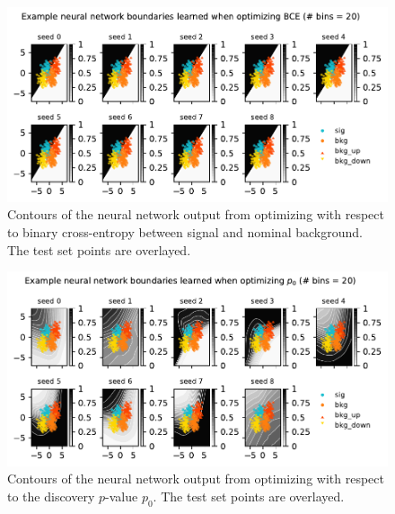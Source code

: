\documentclass[
  11pt,
  numbers=noendperiod]{book}
\begin{document}
\begin{figure}

{\centering \includegraphics{./images/new-grid-models-bce-20nobin (1).pdf}

}

\caption{\label{fig-grid-20bin-bce}Contours of the neural network output
from optimizing with respect to binary cross-entropy between signal and
nominal background. The test set points are overlayed.}

\end{figure}

\begin{figure}

{\centering \includegraphics{./images/new-grid-models-discovery-20nobin (1).pdf}

}

\caption{\label{fig-grid-20bin-discovery}Contours of the neural network
output from optimizing with respect to the discovery \(p\)-value
\(p_0\). The test set points are overlayed.}

\end{figure}
\end{document}
